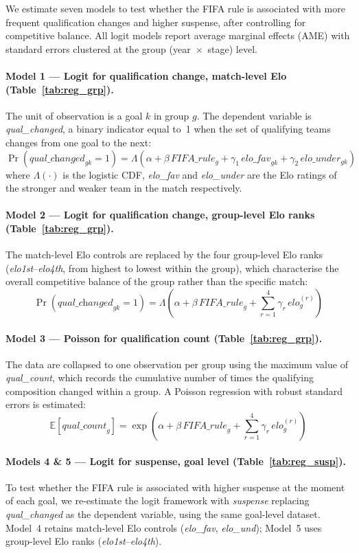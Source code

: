 \documentclass[11pt]{article}
\begin{document}
We estimate seven models to test whether the FIFA rule is associated with more frequent qualification changes and higher suspense, after controlling for competitive balance. All logit models report average marginal effects (AME) with standard errors clustered at the group (year~$\times$~stage) level. 

\paragraph{Model 1 — Logit for qualification change, match-level Elo (Table~\ref{tab:reg_grp}).}
The unit of observation is a goal $k$ in group $g$. The dependent variable is \textit{qual\_changed}, a binary indicator equal to~1 when the set of qualifying teams changes from one goal to the next:
\[
\Pr(\textit{qual\_changed}_{gk} = 1)
  = \Lambda\!\left(\alpha + \beta\,\textit{FIFA\_rule}_g
  + \gamma_1\,\textit{elo\_fav}_{gk} + \gamma_2\,\textit{elo\_under}_{gk}\right)
\]
where $\Lambda(\cdot)$ is the logistic CDF, \textit{elo\_fav} and \textit{elo\_under} are the Elo ratings of the stronger and weaker team in the match respectively.

\paragraph{Model 2 — Logit for qualification change, group-level Elo ranks (Table~\ref{tab:reg_grp}).}
The match-level Elo controls are replaced by the four group-level Elo ranks (\textit{elo1st}--\textit{elo4th}, from highest to lowest within the group), which characterise the overall competitive balance of the group rather than the specific match:
\[
\Pr(\textit{qual\_changed}_{gk} = 1)
  = \Lambda\!\left(\alpha + \beta\,\textit{FIFA\_rule}_g
  + \sum_{r=1}^{4} \gamma_r\,\textit{elo}^{(r)}_g\right)
\]

\paragraph{Model 3 — Poisson for qualification count (Table~\ref{tab:reg_grp}).}
The data are collapsed to one observation per group using the maximum value of \textit{qual\_count}, which records the cumulative number of times the qualifying composition changed within a group. A Poisson regression with robust standard errors is estimated:
\[
\mathbb{E}[\textit{qual\_count}_g]
  = \exp\!\left(\alpha + \beta\,\textit{FIFA\_rule}_g
  + \sum_{r=1}^{4} \gamma_r\,\textit{elo}^{(r)}_g\right)
\]

\paragraph{Models 4 \& 5 — Logit for suspense, goal level (Table~\ref{tab:reg_susp}).}
To test whether the FIFA rule is associated with higher suspense at the moment of each goal, we re-estimate the logit framework with \textit{suspense} replacing \textit{qual\_changed} as the dependent variable, using the same goal-level dataset. Model~4 retains match-level Elo controls (\textit{elo\_fav}, \textit{elo\_und}); Model~5 uses group-level Elo ranks (\textit{elo1st}--\textit{elo4th}).
\end{document}

